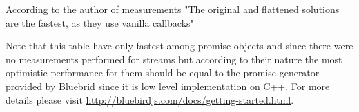 According to the author of measurements \cite{asyncPerformance_2} "The original and flattened solutions are the fastest, as they use vanilla callbacks"\cite{asyncPerformance}

Note that this table have only fastest among promise objects and since there were no measurements performed for streams but according to their nature the most optimistic performance for them should be equal to the promise generator provided by Bluebrid since it is low level implementation on C++. For more details please visit \url{http://bluebirdjs.com/docs/getting-started.html}.



